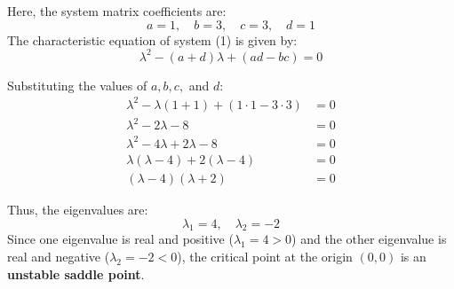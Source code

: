 Here, the system matrix coefficients are:
\[
a = 1, \quad b = 3, \quad c = 3, \quad d = 1
\]
The characteristic equation of system (1) is given by:
\[
\lambda^2 - (a + d)\lambda + (ad - bc) = 0
\]

\noindent Substituting the values of $a, b, c,$ and $d$:
\begin{align*}
    \lambda^2 - \lambda(1 + 1) + (1 \cdot 1 - 3 \cdot 3) &= 0 \\[0.5em]
    \lambda^2 - 2\lambda - 8 &= 0 \\[0.5em]
    \lambda^2 - 4\lambda + 2\lambda - 8 &= 0 \\[0.5em]
    \lambda(\lambda - 4) + 2(\lambda - 4) &= 0 \\[0.5em]
    (\lambda - 4)(\lambda + 2) &= 0
\end{align*}

\noindent Thus, the eigenvalues are:
\[
\lambda_1 = 4, \quad \lambda_2 = -2
\]
Since one eigenvalue is real and positive ($\lambda_1 = 4 > 0$) and the other eigenvalue is real and negative ($\lambda_2 = -2 < 0$), the critical point at the origin $(0, 0)$ is an \textbf{unstable saddle point}.
